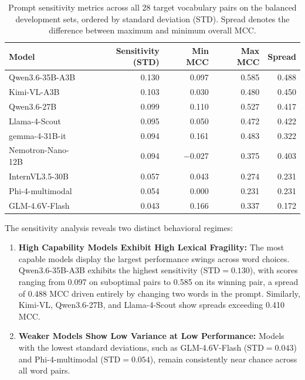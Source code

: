 \begin{table}[t]
	\centering
	\small
	\setlength{\tabcolsep}{6pt}
	\caption{Prompt sensitivity metrics across all 28 target vocabulary pairs on the balanced development sets, ordered by standard deviation (STD). Spread denotes the difference between maximum and minimum overall MCC.}
	\label{tab:results_stage1_sensitivity}
	\begin{tabular}{lrrrr}
		\toprule
		\textbf{Model} & \textbf{Sensitivity (STD)} & \textbf{Min MCC} & \textbf{Max MCC} & \textbf{Spread} \\
		\midrule
		Qwen3.6-35B-A3B   & \num{0.130} & \num{0.097}  & \num{0.585} & \num{0.488} \\
		Kimi-VL-A3B       & \num{0.103} & \num{0.030}  & \num{0.480} & \num{0.450} \\
		Qwen3.6-27B       & \num{0.099} & \num{0.110}  & \num{0.527} & \num{0.417} \\
		Llama-4-Scout     & \num{0.095} & \num{0.050}  & \num{0.472} & \num{0.422} \\
		gemma-4-31B-it    & \num{0.094} & \num{0.161}  & \num{0.483} & \num{0.322} \\
		Nemotron-Nano-12B & \num{0.094} & \num{-0.027} & \num{0.375} & \num{0.403} \\
		InternVL3.5-30B   & \num{0.057} & \num{0.043}  & \num{0.274} & \num{0.231} \\
		Phi-4-multimodal  & \num{0.054} & \num{0.000}  & \num{0.231} & \num{0.231} \\
		GLM-4.6V-Flash    & \num{0.043} & \num{0.166}  & \num{0.337} & \num{0.172} \\
		\bottomrule
	\end{tabular}
\end{table}

The sensitivity analysis reveals two distinct behavioral regimes:
\begin{enumerate}
    \item \textbf{High Capability Models Exhibit High Lexical Fragility:} The most capable models display the largest performance swings across word choices. Qwen3.6-35B-A3B exhibits the highest sensitivity ($\text{STD} = \num{0.130}$), with scores ranging from \num{0.097} on suboptimal pairs to \num{0.585} on its winning pair, a spread of \num{0.488} MCC driven entirely by changing two words in the prompt. Similarly, Kimi-VL, Qwen3.6-27B, and Llama-4-Scout show spreads exceeding \num{0.410} MCC.
    \item \textbf{Weaker Models Show Low Variance at Low Performance:} Models with the lowest standard deviations, such as GLM-4.6V-Flash ($\text{STD} = \num{0.043}$) and Phi-4-multimodal ($\text{STD} = \num{0.054}$), remain consistently near chance across all word pairs.
\end{enumerate}

